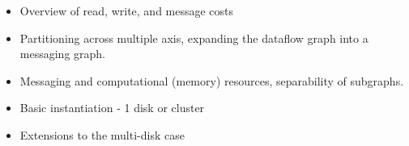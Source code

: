 \begin{itemize}
\item Overview of read, write, and message costs

\item Partitioning across multiple axis, expanding the dataflow graph into a messaging graph.  

\item Messaging and computational (memory) resources, separability of subgraphs.

\item Basic instantiation - 1 disk or cluster

\item Extensions to the multi-disk case
\end{itemize}
